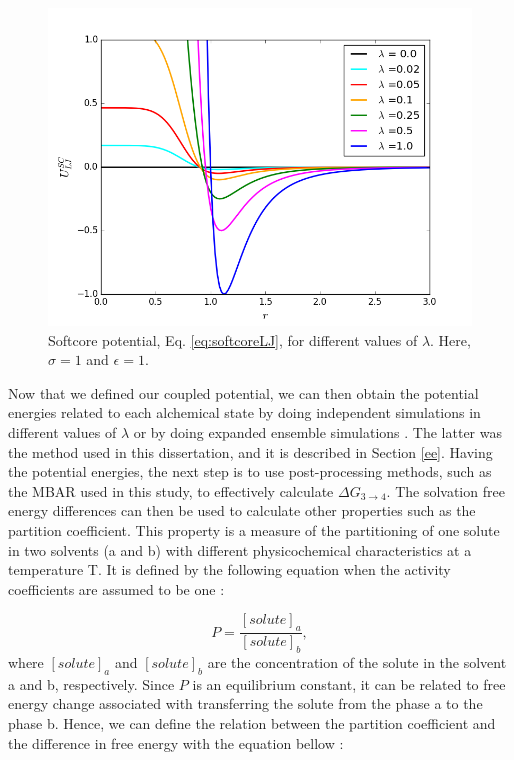 \begin{figure}[H]
	\centering
	\includegraphics[width=0.8\linewidth]{Figures/soft}
	\caption{Softcore potential, Eq. \ref{eq:softcoreLJ}, for different values of $\lambda$. Here, $\sigma=1$ and $\epsilon=1$.}
	\label{fig:SC}
\end{figure}

Now that we defined our coupled potential, we can then obtain the potential energies related to each alchemical state by doing independent simulations in different values of $\lambda$ or by doing expanded ensemble simulations \cite{lyubartsev}. The latter was the method used in this dissertation, and it is described in Section \ref{ee}. Having the potential energies, the next step is to use post-processing methods, such as the MBAR used in this study, to effectively calculate $\Delta G_{3 \rightarrow 4}$.  The solvation free energy differences can then be used to calculate other properties such as the partition coefficient. This property is a measure of the partitioning of one solute in two solvents (a and b) with different physicochemical characteristics  at a temperature T. It is defined by the following equation when the activity coefficients are assumed to be one \cite{doi:10.1021/ja00036a009}:

\begin{equation}
P = \dfrac{[solute]_{a}}{[solute]_{b}},
\end{equation} 
where $[solute]_{a}$ and $[solute]_{b}$ are the concentration of the solute in the solvent a and b, respectively. Since $P$ is an equilibrium constant, it can be related to free energy change associated with transferring the solute from the phase a to the phase b. Hence, we can define the relation between the partition coefficient and the difference in free energy with the equation bellow \cite{doi:10.1021/ja00036a009}:  

